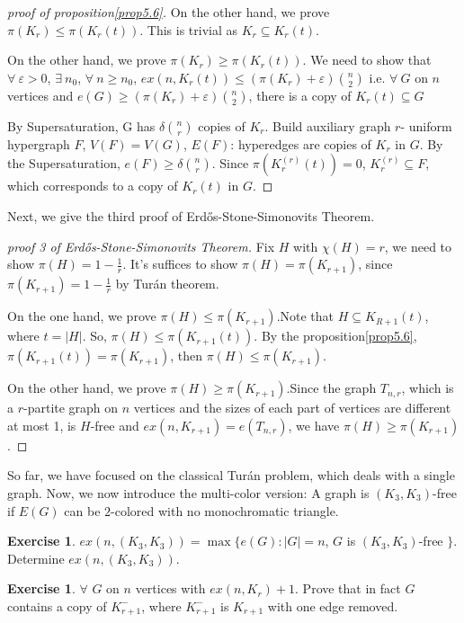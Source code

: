 \documentclass{article}
\theoremstyle{definition}
\newtheorem{exercise}[theorem]{Exercise}
\def\Erdos{Erd\H{o}s}
\def\Turan{Tur\'an}
\renewcommand{\epsilon}{\varepsilon}
\begin{document}
\begin{proof}[proof of proposition\ref{prop5.6}]
    On the other hand, we prove $\pi(K_r)\leq\pi(K_r(t))$. This is trivial as $K_r\subseteq K_r(t)$.

    On the other hand, we prove $\pi(K_r)\geq\pi(K_r(t))$. We need to show that $\forall \ \epsilon>0$, $\exists \ n_0$, $\forall\ n\geq n_0$, $ex(n,K_r(t))\leq(\pi(K_r)+\epsilon)\binom{n}{2}$ i.e. $\forall \ G$ on $n$ vertices and $e(G)\geq(\pi(K_r)+\epsilon)\binom{n}{2}$, there is a copy of $K_r(t)\subseteq G$

    By Supersaturation, G has $\delta \binom{n}{r}$ copies of $K_r$. Build auxiliary graph $r$- uniform hypergraph $F$, $V(F)=V(G)$, $E(F)$: hyperedges are copies of $K_r$ in $G$. By the Supersaturation, $e(F)\geq\delta \binom{n}{r}$. Since $\pi(K_r^{(r)}(t))=0$, $K_r^{(r)}\subseteq F$, which corresponds to a copy of $K_r(t)$ in $G$.
\end{proof}
Next, we give the third proof of \Erdos{}-Stone-Simonovits Theorem.
\begin{proof}[proof 3 of \Erdos{}-Stone-Simonovits Theorem]
Fix $H$ with $\chi(H)=r$, we need to show $\pi(H)=1-\frac{1}{r}$. It's suffices to show $\pi(H)=\pi(K_{r+1})$, since $\pi(K_{r+1})=1-\frac{1}{r}$
 by \Turan{} theorem.
 
On the one hand, we prove $\pi(H)\leq\pi(K_{r+1})$.Note that $H\subseteq K_{R+1}(t)$, where $t=|H|$. So, $\pi(H)\leq\pi(K_{r+1}(t))$. By the proposition\ref{prop5.6}, $\pi(K_{r+1}(t))=\pi(K_{r+1})$, then $\pi(H)\leq\pi(K_{r+1})$.

On the other hand, we prove $\pi(H)\geq\pi(K_{r+1})$.Since the graph $T_{n,r}$, which is a $r$-partite graph on $n$ vertices and the sizes of each part of vertices  are different at most 1, is $H$-free and 
 $ex(n,K_{r+1})=e(T_{n,r})$, we have $\pi(H)\geq\pi(K_{r+1})$.
\end{proof}

So far, we have focused on the classical \Turan{} problem, which deals with a single graph. Now, we now introduce the multi-color version: A graph is $(K_3, K_3)$-free if $E(G)$ can be $2$-colored with no monochromatic triangle.

\begin{exercise}
    $ex(n,(K_3,K_3))=\max \{e(G): |G|=n$, $G$ is  $(K_3,K_3)$-free $\}$. Determine $ex(n,(K_3,K_3))$.
\end{exercise}

\begin{exercise}\label{ex5.8}
    $\forall$ $G$ on $n$ vertices with $ex(n,K_r)+1$. Prove that in fact $G$ contains a copy of $K_{r+1}^-$, where $K_{r+1}^-$ is $K_{r+1}$ with one edge removed.
\end{exercise}
\end{document}
